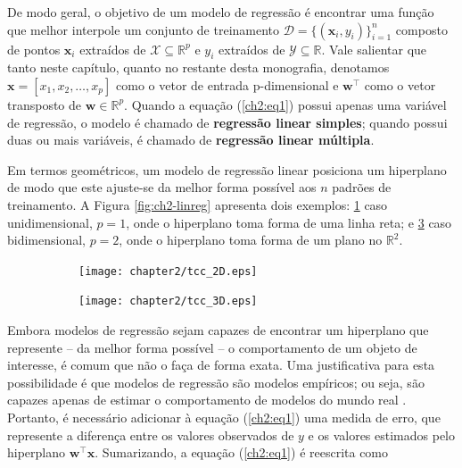 De modo geral, o objetivo de um modelo de regressão é encontrar uma função que melhor interpole um conjunto de treinamento $\mathcal{D} = \{(\mathbf{x}_i, y_i)\}^{n}_{i=1}$ composto de pontos $\mathbf{x}_i$ extraídos de $\mathcal{X} \subseteq \mathbb{R}^p$ e $y_i$ extraídos de $\mathcal{Y} \subseteq \mathbb{R}$. Vale salientar que tanto neste capítulo, quanto no restante desta monografia, denotamos $\mathbf{x} = [x_1,x_2,\ldots,x_p]$ como o vetor de entrada p-dimensional e $\mathbf{w}^{\top}$ como o vetor transposto de $\mathbf{w} \in \mathbb{R}^p$. Quando a equação (\ref{ch2:eq1}) possui apenas uma variável de regressão, o modelo é chamado de \textbf{regressão linear simples}; quando possui duas ou mais variáveis, é chamado de \textbf{regressão linear múltipla}.

Em termos geométricos, um modelo de regressão linear posiciona um hiperplano de modo que este ajuste-se da melhor forma possível aos $n$ padrões de treinamento. A Figura \ref{fig:ch2-linreg} apresenta dois exemplos: \ref{fig:ch2-linreg1} caso unidimensional, $p = 1$, onde o hiperplano toma forma de uma linha reta; e \ref{fig:ch2-linreg2} caso bidimensional, $p = 2$, onde o hiperplano toma forma de um plano no $\mathbb{R}^2$.

\begin{figure}[ht]
    \caption{Hiperplanos obtidos por um modelo de regressão linear para funções que contém ruído, onde:  apresenta a reta estimada para padrões unidimensionais descritos pela função $f(x) = 2x + 3$, e  apresenta o plano estimado para padrões bidimensionais descritos pela função $f(x_1, x_2) = (3 - 2x_1 - 5x_2)/4$.}
    \label{fig:ch2-linreg}
    \begin{subfigure}[b]{0.49\linewidth}
        \centering
        \texttt{[image: chapter2/tcc\_2D.eps]}
        \caption{}
        \label{fig:ch2-linreg1}
    \end{subfigure}%
    \begin{subfigure}[b]{0.49\linewidth}
        \centering
        \texttt{[image: chapter2/tcc\_3D.eps]}
        \caption{}
        \label{fig:ch2-linreg2}
    \end{subfigure}
    \centering {}
\end{figure}

Embora modelos de regressão sejam capazes de encontrar um hiperplano que represente -- da melhor forma possível -- o comportamento de um objeto de interesse, é comum que não o faça de forma exata. Uma justificativa para esta possibilidade é que modelos de regressão são modelos empíricos; ou seja, são capazes apenas de estimar o comportamento de modelos do mundo real \cite{montgomery2012}. Portanto, é necessário adicionar à equação (\ref{ch2:eq1}) uma medida de erro, que represente a diferença entre os valores observados de $y$ e os valores estimados pelo hiperplano $\mathbf{w}^{\top}\mathbf{x}$. Sumarizando, a equação (\ref{ch2:eq1}) é reescrita como

